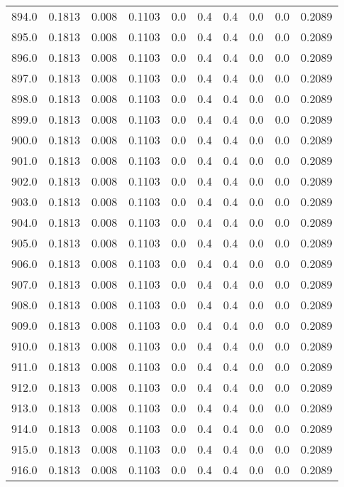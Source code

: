 \begin{longtable}{lrrrrrrrrr}
894.0 & 0.1813 & 0.008 & 0.1103 & 0.0 & 0.4 & 0.4 & 0.0 & 0.0 & 0.2089 \\
895.0 & 0.1813 & 0.008 & 0.1103 & 0.0 & 0.4 & 0.4 & 0.0 & 0.0 & 0.2089 \\
896.0 & 0.1813 & 0.008 & 0.1103 & 0.0 & 0.4 & 0.4 & 0.0 & 0.0 & 0.2089 \\
897.0 & 0.1813 & 0.008 & 0.1103 & 0.0 & 0.4 & 0.4 & 0.0 & 0.0 & 0.2089 \\
898.0 & 0.1813 & 0.008 & 0.1103 & 0.0 & 0.4 & 0.4 & 0.0 & 0.0 & 0.2089 \\
899.0 & 0.1813 & 0.008 & 0.1103 & 0.0 & 0.4 & 0.4 & 0.0 & 0.0 & 0.2089 \\
900.0 & 0.1813 & 0.008 & 0.1103 & 0.0 & 0.4 & 0.4 & 0.0 & 0.0 & 0.2089 \\
901.0 & 0.1813 & 0.008 & 0.1103 & 0.0 & 0.4 & 0.4 & 0.0 & 0.0 & 0.2089 \\
902.0 & 0.1813 & 0.008 & 0.1103 & 0.0 & 0.4 & 0.4 & 0.0 & 0.0 & 0.2089 \\
903.0 & 0.1813 & 0.008 & 0.1103 & 0.0 & 0.4 & 0.4 & 0.0 & 0.0 & 0.2089 \\
904.0 & 0.1813 & 0.008 & 0.1103 & 0.0 & 0.4 & 0.4 & 0.0 & 0.0 & 0.2089 \\
905.0 & 0.1813 & 0.008 & 0.1103 & 0.0 & 0.4 & 0.4 & 0.0 & 0.0 & 0.2089 \\
906.0 & 0.1813 & 0.008 & 0.1103 & 0.0 & 0.4 & 0.4 & 0.0 & 0.0 & 0.2089 \\
907.0 & 0.1813 & 0.008 & 0.1103 & 0.0 & 0.4 & 0.4 & 0.0 & 0.0 & 0.2089 \\
908.0 & 0.1813 & 0.008 & 0.1103 & 0.0 & 0.4 & 0.4 & 0.0 & 0.0 & 0.2089 \\
909.0 & 0.1813 & 0.008 & 0.1103 & 0.0 & 0.4 & 0.4 & 0.0 & 0.0 & 0.2089 \\
910.0 & 0.1813 & 0.008 & 0.1103 & 0.0 & 0.4 & 0.4 & 0.0 & 0.0 & 0.2089 \\
911.0 & 0.1813 & 0.008 & 0.1103 & 0.0 & 0.4 & 0.4 & 0.0 & 0.0 & 0.2089 \\
912.0 & 0.1813 & 0.008 & 0.1103 & 0.0 & 0.4 & 0.4 & 0.0 & 0.0 & 0.2089 \\
913.0 & 0.1813 & 0.008 & 0.1103 & 0.0 & 0.4 & 0.4 & 0.0 & 0.0 & 0.2089 \\
914.0 & 0.1813 & 0.008 & 0.1103 & 0.0 & 0.4 & 0.4 & 0.0 & 0.0 & 0.2089 \\
915.0 & 0.1813 & 0.008 & 0.1103 & 0.0 & 0.4 & 0.4 & 0.0 & 0.0 & 0.2089 \\
916.0 & 0.1813 & 0.008 & 0.1103 & 0.0 & 0.4 & 0.4 & 0.0 & 0.0 & 0.2089 \\

\end{longtable}
